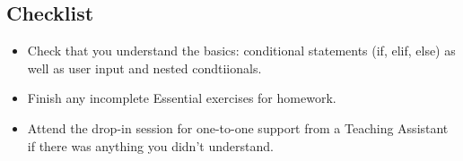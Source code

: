\documentclass[11pt]{report}
\begin{document}



\subsection*{Checklist}
\begin{itemize}
	\item Check that you understand the basics: conditional statements (if, elif, else) as well as user input and nested condtiionals.
	\item Finish any incomplete Essential exercises for homework. 
	\item Attend the drop-in session for one-to-one support from a Teaching Assistant if there was anything you didn't understand.
\end{itemize}
\end{document}
